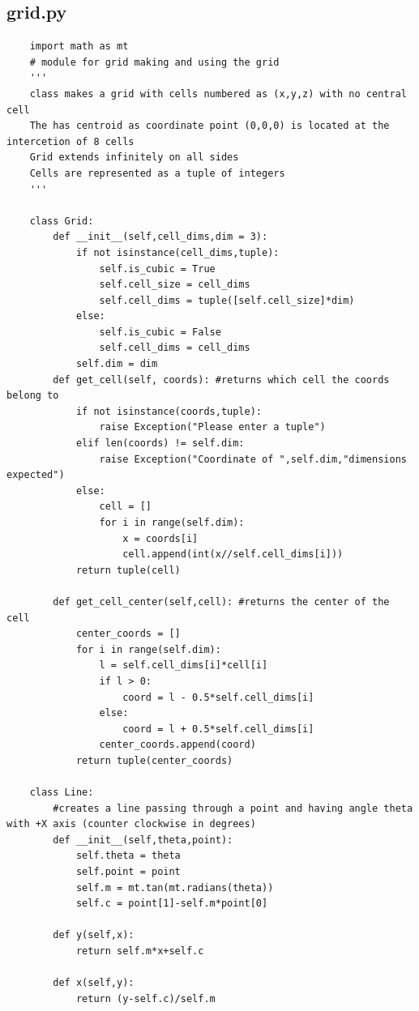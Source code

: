 \documentclass{article}
\begin{document}
\subsection{grid.py}
\begin{verbatim}
    import math as mt
    # module for grid making and using the grid
    ''' 
    class makes a grid with cells numbered as (x,y,z) with no central cell
    The has centroid as coordinate point (0,0,0) is located at the intercetion of 8 cells 
    Grid extends infinitely on all sides 
    Cells are represented as a tuple of integers
    '''
    
    class Grid:
        def __init__(self,cell_dims,dim = 3):
            if not isinstance(cell_dims,tuple):
                self.is_cubic = True
                self.cell_size = cell_dims
                self.cell_dims = tuple([self.cell_size]*dim)
            else:
                self.is_cubic = False
                self.cell_dims = cell_dims
            self.dim = dim
        def get_cell(self, coords): #returns which cell the coords belong to
            if not isinstance(coords,tuple):
                raise Exception("Please enter a tuple")
            elif len(coords) != self.dim:
                raise Exception("Coordinate of ",self.dim,"dimensions expected")
            else:
                cell = []
                for i in range(self.dim):
                    x = coords[i] 
                    cell.append(int(x//self.cell_dims[i]))
            return tuple(cell)
        
        def get_cell_center(self,cell): #returns the center of the cell
            center_coords = []
            for i in range(self.dim):
                l = self.cell_dims[i]*cell[i]
                if l > 0:
                    coord = l - 0.5*self.cell_dims[i]
                else:
                    coord = l + 0.5*self.cell_dims[i]
                center_coords.append(coord)
            return tuple(center_coords)
    
    class Line:
        #creates a line passing through a point and having angle theta with +X axis (counter clockwise in degrees)
        def __init__(self,theta,point):
            self.theta = theta
            self.point = point
            self.m = mt.tan(mt.radians(theta))
            self.c = point[1]-self.m*point[0]
        
        def y(self,x): 
            return self.m*x+self.c
        
        def x(self,y):
            return (y-self.c)/self.m
        

\end{verbatim}
\end{document}
